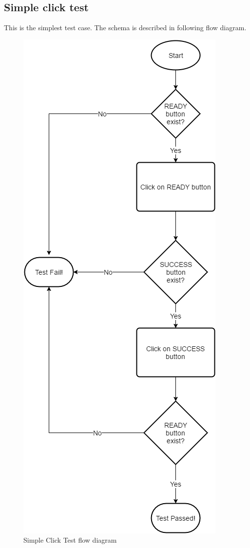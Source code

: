 \subsection{Simple click test}
This is the simplest test case. The schema is described in following flow diagram.

	\begin{figure}[H]
		\centering
		\includegraphics[scale=0.55]{Chapters/Fig/click_test_diag.png}
		\caption{Simple Click Test flow diagram}
		\label{fig:click_test_diag}
	\end{figure}

